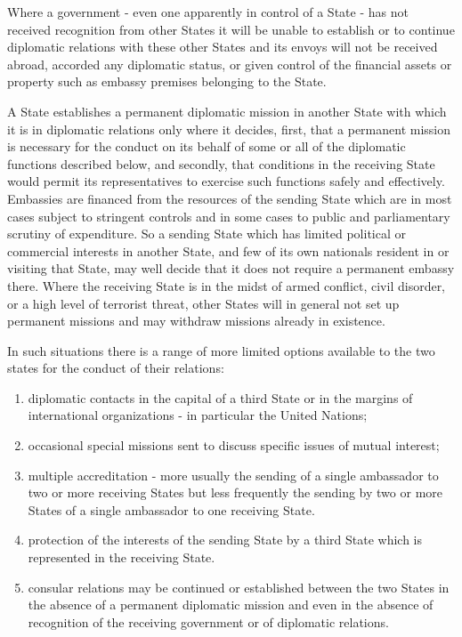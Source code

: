 \documentclass[
  openany]{book}
\providecommand{\tightlist}{%
  \setlength{\itemsep}{0pt}\setlength{\parskip}{0pt}}
\begin{document}
Where a government - even one apparently in control of a State - has not received recognition from other States it will be unable to establish or to continue diplomatic relations with these other States and its envoys will not be received abroad, accorded any diplomatic status, or given control of the financial assets or property such as embassy premises belonging to the State.

A State establishes a permanent diplomatic mission in another State with which it is in diplomatic relations only where it decides, first, that a permanent mission is necessary for the conduct on its behalf of some or all of the diplomatic functions described below, and secondly, that conditions in the receiving State would permit its representatives to exercise such functions safely and effectively. Embassies are financed from the resources of the sending State which are in most cases subject to stringent controls and in some cases to public and parliamentary scrutiny of expenditure. So a sending State which has limited political or commercial interests in another State, and few of its own nationals resident in or visiting that State, may well decide that it does not require a permanent embassy there. Where the receiving State is in the midst of armed conflict, civil disorder, or a high level of terrorist threat, other States will in general not set up permanent missions and may withdraw missions already in existence.

In such situations there is a range of more limited options available to the two states for the conduct of their relations:

\begin{enumerate}
\def\labelenumi{\arabic{enumi}.}
\tightlist
\item
  diplomatic contacts in the capital of a third State or in the margins of international organizations - in particular the United Nations;
\item
  occasional special missions sent to discuss specific issues of mutual interest;
\item
  multiple accreditation - more usually the sending of a single ambassador to two or more receiving States but less frequently the sending by two or more States of a single ambassador to one receiving State.
\item
  protection of the interests of the sending State by a third State which is represented in the receiving State.
\item
  consular relations may be continued or established between the two States in the absence of a permanent diplomatic mission and even in the absence of recognition of the receiving government or of diplomatic relations.
\end{enumerate}
\end{document}
